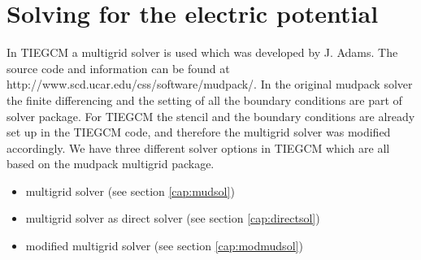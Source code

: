\section{Solving for the electric potential} \label{cap:solve}
%
In TIEGCM a multigrid solver is used which was developed by
J. Adams. The source code and information can be found at
http://www.scd.ucar.edu\-/css\-/software\-/mudpack/. In the original mudpack solver 
the finite differencing and the setting of all the boundary conditions
are part of solver package. For TIEGCM the stencil and the boundary
conditions  are
already set up in the TIEGCM code, and therefore the multigrid
solver was modified accordingly. We have three different solver
options in TIEGCM which are all based on the mudpack multigrid package.
%
\begin{itemize}
  \item {} multigrid solver  (see section \ref{cap:mudsol})
  \item {} multigrid solver  as direct solver (see section 
         \ref{cap:directsol})
  \item {} modified multigrid solver  (see section 
         \ref{cap:modmudsol})
\end{itemize}
%
%
